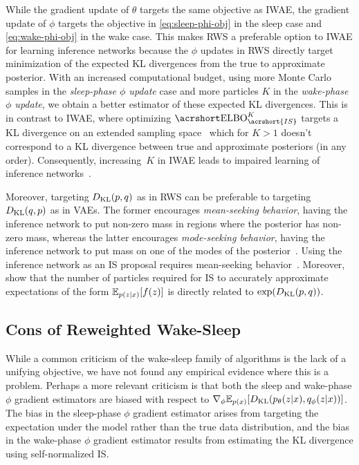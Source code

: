 While the gradient update of $\theta$ targets the same objective as \gls{IWAE}, the gradient update of $\phi$ targets the objective in \cref{eq:sleep-phi-obj} in the sleep case and \cref{eq:wake-phi-obj} in the wake case.
This makes \gls{RWS} a preferable option to \gls{IWAE} for learning inference networks because
the $\phi$ updates in \gls{RWS} directly target minimization of the expected \gls{KL} divergences from the true to approximate posterior.
With an increased computational budget, using more Monte Carlo samples in the \emph{sleep-phase $\phi$ update} case and more particles $K$ in the \emph{wake-phase $\phi$ update}, we obtain a better estimator of these expected \gls{KL} divergences.
This is in contrast to \gls{IWAE}, where optimizing $\ELBO_{\acrshort{IS}}^K$ targets a \gls{KL} divergence on an extended sampling space~\citep{Le2018autoencoding} which for $K > 1$ doesn't correspond to a \gls{KL} divergence between true and approximate posteriors (in any order).
Consequently, increasing~\(K\) in \gls{IWAE} leads to impaired learning of inference networks~\citep{Rainforth2018tighter}.

Moreover, targeting $D_{\mathrm{KL}}(p, q)$ as in \gls{RWS} can be preferable to targeting $D_{\mathrm{KL}}(q, p)$ as in \glspl{VAE}.
The former encourages \emph{mean-seeking behavior}, having the inference network to put non-zero mass in regions where the posterior has non-zero mass, whereas the latter encourages \emph{mode-seeking behavior}, having the inference network to put mass on one of the modes of the posterior~\citep{Minka2005divergence}.
Using the inference network as an \gls{IS} proposal requires mean-seeking behavior~\citep[Theorem 9.2]{owen2013monte}.
Moreover, \citet{Chatterjee2018sample} show that the number of particles required for \gls{IS} to accurately approximate expectations of the form $\mathbb{E}_{p(z \lvert x)}[f(z)]$ is directly related to $\exp(D_{\mathrm{KL}}(p, q))$.

\subsection{Cons of Reweighted Wake-Sleep}
\label{sec:disadvantages}

While a common criticism of the wake-sleep family of algorithms is the lack of a unifying objective, we have not found any empirical evidence where this is a problem.
Perhaps a more relevant criticism is that both the sleep and wake-phase $\phi$ gradient estimators are biased with respect to $\nabla_\phi \mathbb{E}_{p(x)}[D_{\mathrm{KL}}(p_\theta(z \lvert x), q_\phi(z \lvert x))]$.
The bias in the sleep-phase $\phi$ gradient estimator arises from targeting the expectation under the model rather than the true data distribution, and the bias in the wake-phase $\phi$ gradient estimator results from estimating the \gls{KL} divergence using self-normalized \gls{IS}.


